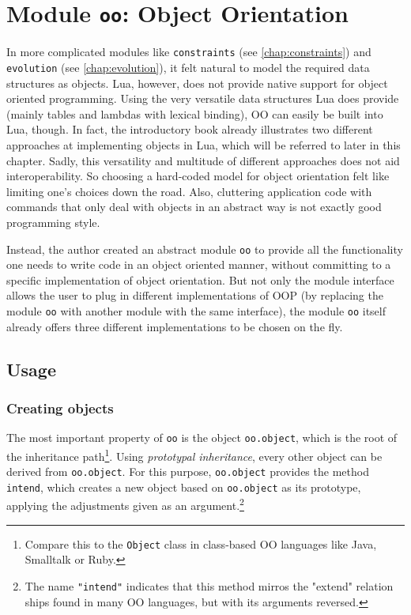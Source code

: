 \chapter{Module \texttt{oo}: Object Orientation}
\label{oo}
\label{chap:oo}

In more complicated modules like \texttt{constraints} (see \ref{chap:constraints}) and \texttt{evolution} (see \ref{chap:evolution}), it felt natural to model the required data structures as objects. Lua, however, does not provide native support for object oriented programming. Using the very versatile data structures Lua does provide (mainly tables and lambdas with lexical binding), OO can easily be built into Lua, though. In fact, the introductory book \cite{Ierusalimschy2006} already illustrates two different approaches at implementing objects in Lua, which will be referred to later in this chapter. Sadly, this versatility and multitude of different approaches does not aid interoperability. So choosing a hard-coded model for object orientation felt like limiting one's choices down the road. Also, cluttering application code with commands that only deal with objects in an abstract way is not exactly good programming style.

Instead, the author created an abstract module \texttt{oo} to provide all the functionality one needs to write code in an object oriented manner, without committing to a specific implementation of object orientation. But not only the module interface allows the user to plug in different implementations of OOP (by replacing the module \texttt{oo} with another module with the same interface), the module \texttt{oo} itself already offers three different implementations to be chosen on the fly.

\section{Usage}

\subsection{Creating objects}

The most important property of \texttt{oo} is the object \texttt{oo.object}, which is the root of the inheritance path\footnote{Compare this to the \texttt{Object} class in class-based OO languages like Java, Smalltalk or Ruby.}. Using \emph{prototypal inheritance}, every other object can be derived from \texttt{oo.object}. For this purpose, \texttt{oo.object} provides the method \texttt{intend}, which creates a new object based on \texttt{oo.object} as its prototype, applying the adjustments given as an argument.\footnote{The name \texttt{"intend"} indicates that this method mirros the "extend" relation ships found in many OO languages, but with its arguments reversed.}

